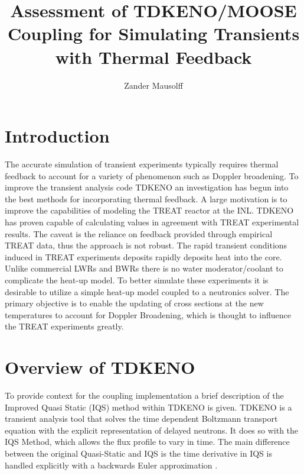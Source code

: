 \documentclass[11pt]{article}
\begin{document}
%
\author{Zander Mausolff}
\title{Assessment of TDKENO/MOOSE Coupling for Simulating Transients with Thermal Feedback}
\maketitle

\section{Introduction}
The accurate simulation of transient experiments typically requires thermal feedback to account for a variety of phenomenon such as Doppler broadening. To improve the transient analysis code TDKENO an investigation has begun into the best methods for incorporating thermal feedback. A large motivation is to improve the capabilities of modeling the TREAT reactor at the INL. TDKENO has proven capable of calculating values in agreement with TREAT experimental results.  The caveat is the reliance on feedback provided through empirical TREAT data, thus the approach is not robust.
The rapid transient conditions induced in TREAT experiments deposits rapidly deposits heat into the core.  Unlike commercial LWRs and BWRs there is no water moderator/coolant to complicate the heat-up model.  To better simulate these experiments it is desirable to utilize a simple heat-up model coupled to a neutronics solver. The primary objective is to enable the updating of cross sections at the new temperatures to account for Doppler Broadening, which is thought to influence the TREAT experiments greatly.  

\section{Overview of TDKENO}
To provide context for the coupling implementation a brief description of the Improved Quasi Static (IQS) method within TDKENO is given.  TDKENO is a transient analysis tool that solves the time dependent Boltzmann transport equation with the explicit representation of delayed neutrons. It does so with the IQS Method, which allows the flux profile to vary in time.  The main difference between the original Quasi-Static and IQS is the time derivative in IQS is handled explicitly with a backwards Euler approximation \cite{goluoglu2001time}. 
\end{document}

